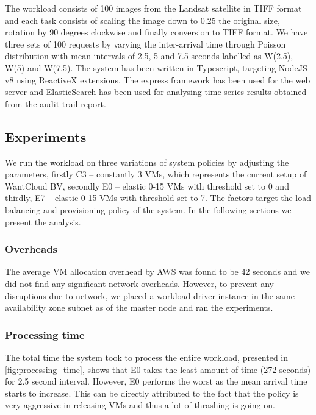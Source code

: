 \documentclass[a4paper]{IEEEtran}
\begin{document}
 The workload consists of 100 images from the Landsat satellite in TIFF format and each task consists of
 scaling the image down to 0.25 the original size, rotation by 90 degrees clockwise and finally conversion to 
 TIFF format. We have three sets of 100 requests by varying the inter-arrival time through Poisson distribution
 with mean intervals of 2.5, 5 and 7.5 seconds labelled as \textsc{W(2.5)}, \textsc{W(5)} and \textsc{W(7.5)}. The
 system has been written in Typescript, targeting NodeJS v8 using ReactiveX extensions. The express framework has
 been used for the web server and ElasticSearch has been used for analysing time series results obtained from
 the audit trail report. 

\subsection{Experiments}

We run the workload on three variations of system policies by adjusting the parameters,
 firstly \textsc{C3} -- constantly 3 VMs, which represents the current setup of WantCloud BV, secondly \textsc{E0} -- elastic 0-15 VMs with threshold set to 0 and thirdly, \textsc{E7} -- elastic 0-15 VMs with threshold set to 7. The factors target the load balancing and provisioning policy of the system. In the following sections we present the analysis.

\subsubsection{Overheads}

The average VM allocation overhead by AWS was found to be 42 seconds and we did not find any significant network overheads. However, to prevent any disruptions due to network, we placed a workload driver instance in the same availability zone subnet as of the master node and ran the experiments.

\subsubsection{Processing time}

The total time the system took to process the entire workload, presented
in \autoref{fig:processing_time}, shows that E0 takes the least amount of time (272 seconds) for 2.5 second
interval. However, E0 performs the worst as the mean arrival time starts to increase. This can be directly attributed
to the fact that the policy is very aggressive in releasing VMs and thus a lot of thrashing is going on.
\end{document}
